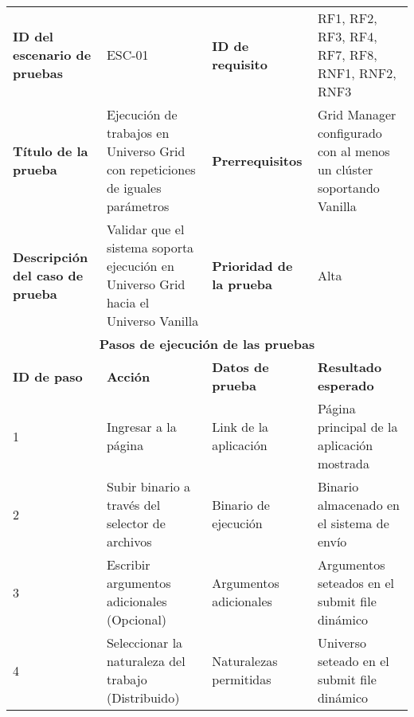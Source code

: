 \begin{table}[H]
	\centering
	\renewcommand{\arraystretch}{1.2} %
	\fontsize{9pt}{10pt}\selectfont %
	\begin{tabular}{|p{2cm}|p{4cm}|p{2.5cm}|p{4.7cm}|} %
		\hline
		\textbf{ID del escenario de pruebas}    & ESC-01                                                                              & \textbf{ID de requisito}        & RF1, RF2, RF3, RF4, RF7, RF8, RNF1, RNF2, RNF3                      \\
		\textbf{Título de la prueba}            & Ejecución de trabajos en Universo Grid con repeticiones de iguales parámetros       & \textbf{Prerrequisitos}         & Grid Manager configurado con al menos un clúster soportando Vanilla \\
		\textbf{Descripción del caso de prueba} & Validar que el sistema soporta ejecución en Universo Grid hacia el Universo Vanilla & \textbf{Prioridad de la prueba} & Alta                                                                \\
		\hline
		\multicolumn{4}{|c|}{\textbf{Pasos de ejecución de las pruebas}}                                                                                                                                                                      \\
		\hline
		\textbf{ID de paso}                     & \textbf{Acción}                                                                     & \textbf{Datos de prueba}        & \textbf{Resultado esperado}                                         \\
		1                                       & Ingresar a la página                                                                & Link de la aplicación           & Página principal de la aplicación mostrada                          \\
		2                                       & Subir binario a través del selector de archivos                                     & Binario de ejecución            & Binario almacenado en el sistema de envío                           \\
		3                                       & Escribir argumentos adicionales (Opcional)                                          & Argumentos adicionales          & Argumentos seteados en el submit file dinámico                      \\
		4                                       & Seleccionar la naturaleza del trabajo (Distribuido)                                 & Naturalezas permitidas          & Universo seteado en el submit file dinámico                         \\

\end{tabular}
\end{table}
